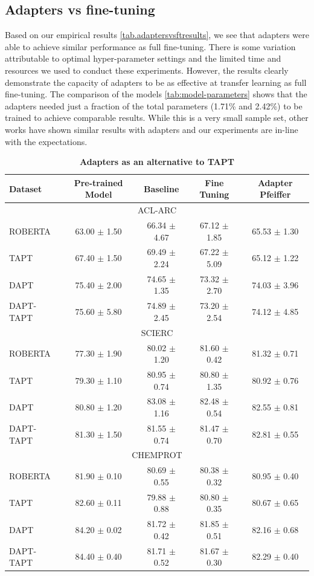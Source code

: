 \documentclass[10pt,twocolumn,letterpaper]{article}
\begin{document}
\subsection{Adapters vs fine-tuning} Based on our empirical results \ref{tab.adaptersvsftresults}, we see that adapters were able to achieve similar performance as full fine-tuning. There is some variation attributable to optimal hyper-parameter settings and the limited time and resources we used to conduct these experiments. However, the results clearly demonstrate the capacity of adapters to be as effective at transfer learning as full fine-tuning. The comparison of the models \ref{tab:model-parameters} shows that the adapters needed just a fraction of the total parameters (1.71\% and 2.42\%) to be trained to achieve comparable results. While this is a very small sample set, other works have shown similar results \cite{houlsby2019parameter} with adapters and our experiments are in-line with the expectations.

\begin{table}[h]
\centering
\begin{tabular}{lcccc}
\hline
\textbf{Dataset} & \textbf{Pre-trained Model} & \textbf{Baseline} & \textbf{Fine Tuning} & \textbf{Adapter Pfeiffer} \\
\hline
\multicolumn{6}{c}{ACL-ARC} \\
ROBERTA & 63.00 $\pm$ 1.50 & 66.34 $\pm$ 4.67 & 67.12 $\pm$ 1.85 & 65.53 $\pm$ 1.30 \\
TAPT & 67.40 $\pm$ 1.50 & 69.49 $\pm$ 2.24 & 67.22 $\pm$ 5.09 & 65.12 $\pm$ 1.22 \\
DAPT & 75.40 $\pm$ 2.00 & 74.65 $\pm$ 1.35 & 73.32 $\pm$ 2.70 & 74.03 $\pm$ 3.96 \\
DAPT-TAPT & 75.60 $\pm$ 5.80 & 74.89 $\pm$ 2.45 & 73.20 $\pm$ 2.54 & 74.12 $\pm$ 4.85 \\
\hline
\multicolumn{6}{c}{SCIERC} \\
ROBERTA & 77.30 $\pm$ 1.90 & 80.02 $\pm$ 1.20 & 81.60 $\pm$ 0.42 & 81.32 $\pm$ 0.71 \\
TAPT & 79.30 $\pm$ 1.10 & 80.95 $\pm$ 0.74 & 80.80 $\pm$ 1.35 & 80.92 $\pm$ 0.76 \\
DAPT & 80.80 $\pm$ 1.20 & 83.08 $\pm$ 1.16 & 82.48 $\pm$ 0.54 & 82.55 $\pm$ 0.81 \\
DAPT-TAPT & 81.30 $\pm$ 1.50 & 81.55 $\pm$ 0.74 & 81.47 $\pm$ 0.70 & 82.81 $\pm$ 0.55 \\
\hline
\multicolumn{6}{c}{CHEMPROT} \\
ROBERTA & 81.90 $\pm$ 0.10 & 80.69 $\pm$ 0.55 & 80.38 $\pm$ 0.32 & 80.95 $\pm$ 0.40 \\
TAPT & 82.60 $\pm$ 0.11 & 79.88 $\pm$ 0.88 & 80.80 $\pm$ 0.35 & 80.67 $\pm$ 0.65 \\
DAPT & 84.20 $\pm$ 0.02 & 81.72 $\pm$ 0.42 & 81.85 $\pm$ 0.51 & 82.16 $\pm$ 0.68 \\
DAPT-TAPT & 84.40 $\pm$ 0.40 & 81.71 $\pm$ 0.52 & 81.67 $\pm$ 0.30 & 82.29 $\pm$ 0.40 \\
\hline
\end{tabular}
\caption{\textbf{Adapters as an alternative to TAPT}}
\label{tab.taptadatperresults}
\end{table}
\end{document}
